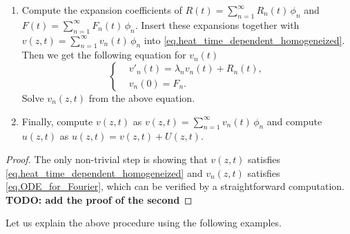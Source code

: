 \begin{theorem}
\begin{enumerate}
\begin{equation}
\begin{aligned}
            &\ \phi(a) \cos \alpha-L \phi^{\prime}(a) \sin \alpha=0,
            \\
            &\ \phi(b) \cos \beta+L \phi^{\prime}(b) \sin \beta=0
        \end{aligned}
        \right\}.
    \end{equation}
    \item Compute the expansion coefficients of $R(t) = \sum_{n = 1}^\infty R_n(t)\, \phi_n$ and $F(t) = \sum_{n = 1}^\infty F_n(t)\, \phi_n$. Insert these expansions together with $v(z, t) = \sum_{n = 1}^\infty v_n(t)\, \phi_n$ into \eqref{eq.heat_time_dependent_homogeneized}. Then we get the following equation for $v_n(t)$ 
    \begin{equation}\label{eq.ODE_for_Fourier}
        \left\{\begin{aligned} 
            &v'_n(t) = \lambda_n v_n(t) + R_n(t), 
            \\
            &v_n(0)=F_n.
        \end{aligned}\right.
    \end{equation}
    Solve $v_n(z, t)$ from the above equation.
    \item Finally, compute $v(z, t)$ as $v(z, t) = \sum_{n = 1}^\infty v_n(t)\, \phi_n$ and compute $u(z, t)$ as $u(z, t) = v(z, t) + U(z, t)$.
    \end{enumerate}
\end{theorem}
\begin{proof}
    The only non-trivial step is showing that $v(z, t)$ satisfies \eqref{eq.heat_time_dependent_homogeneized} and $v_n(z, t)$ satisfies \eqref{eq.ODE_for_Fourier}, which can be verified by a straightforward computation. \textbf{TODO: add the proof of the second}
\end{proof}

Let us explain the above procedure using the following examples.

